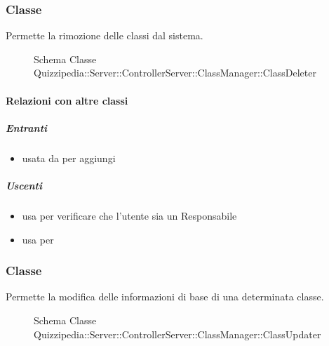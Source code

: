 \subsubsection{Classe }
Permette la rimozione delle classi dal sistema.
\begin{figure}[H]
\centering
\noindent{}
\caption[Schema Classe ClassDeleter]{Schema Classe Quizzipedia::Server::ControllerServer::ClassManager::ClassDeleter}
\end{figure}
\paragraph{Relazioni con altre classi}
\subparagraph{Entranti}
\begin{itemize}
\item usata da  per aggiungi
\end{itemize}
\subparagraph{Uscenti}
\begin{itemize}
\item usa  per verificare che l'utente sia un Responsabile
\item usa  per 
\end{itemize}
\subsubsection{Classe }
Permette la modifica delle informazioni di base di una determinata classe.
\begin{figure}[H]
\centering
\noindent{}
\caption[Schema Classe ClassUpdater]{Schema Classe Quizzipedia::Server::ControllerServer::ClassManager::ClassUpdater}
\end{figure}

